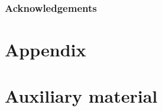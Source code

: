 \documentclass[UKenglish,texlive=2013]{\ATLASLATEXPATH atlasdoc}
\begin{document}
\maketitle

\tableofcontents









\section*{Acknowledgements}
%

\clearpage

\appendix
\part*{Appendix}




\printbibliography

\clearpage


\clearpage

\appendix
\part*{Auxiliary material}
\end{document}
